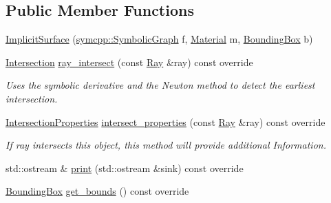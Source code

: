 \subsection*{Public Member Functions}
\begin{DoxyCompactItemize}
\item 
\hyperlink{classImplicitSurface_ab0cfa235e8f935a416c395cfecd2f32b}{Implicit\+Surface} (\hyperlink{classsymcpp_1_1SymbolicGraph}{symcpp\+::\+Symbolic\+Graph} f, \hyperlink{classMaterial}{Material} m, \hyperlink{classBoundingBox}{Bounding\+Box} b)
\item 
\hyperlink{classIntersection}{Intersection} \hyperlink{classImplicitSurface_ad9443ffe39f5c3d65e009aa2dbda81f0}{ray\+\_\+intersect} (const \hyperlink{classRay}{Ray} \&ray) const override
\begin{DoxyCompactList}\small\item\em Uses the symbolic derivative and the Newton method to detect the earliest intersection. \end{DoxyCompactList}\item 
\hyperlink{classIntersectionProperties}{Intersection\+Properties} \hyperlink{classImplicitSurface_a13aa500c7dbcd75e77b43fba741b1ec8}{intersect\+\_\+properties} (const \hyperlink{classRay}{Ray} \&ray) const override
\begin{DoxyCompactList}\small\item\em If ray intersects this object, this method will provide additional Information. \end{DoxyCompactList}\item 
std\+::ostream \& \hyperlink{classImplicitSurface_a2267c88829c97c12ff8f7d250ce94802}{print} (std\+::ostream \&sink) const override
\item 
\hyperlink{classBoundingBox}{Bounding\+Box} \hyperlink{classImplicitSurface_a30f0b97eb9976f8e40be7b990d6352d6}{get\+\_\+bounds} () const override
\end{DoxyCompactItemize}
